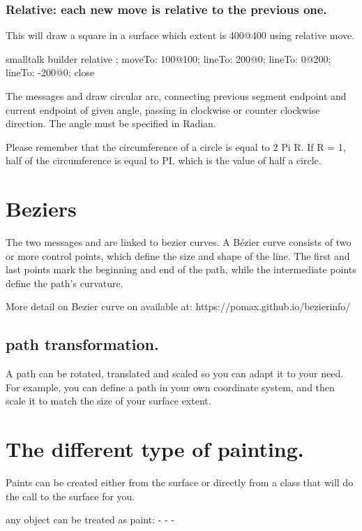 \documentclass[10pt,twoside,english]{_support/latex/sbabook/sbabook}
\begin{document}
\subsubsection{Relative: each new move is relative to the previous one.}
This will draw a square in a surface which extent is 400@400 using relative move.
\begin{displaycode}{smalltalk}
 builder relative ;
  moveTo: 100@100;
  lineTo: 200@0;
  lineTo: 0@200;
  lineTo: -200@0;
  close
\end{displaycode}

The messages  and  draw circular arc, connecting
previous segment endpoint and current endpoint of given angle, passing in
clockwise or counter clockwise direction. The angle must be specified in Radian.

Please remember that the circumference of a circle is equal to 2 Pi  R.
If R = 1, half of the circumference is equal to PI, which is the value of half a circle.

\section{Beziers}
The two messages and  are linked to bezier curves.
A B\'{e}zier curve consists of two or more control points, which define the size and shape of the line. The first and  last points mark the beginning and end of the path, while the intermediate
points define the path's curvature.

More detail on Bezier curve on available at: https://pomax.github.io/bezierinfo/

\subsection{path transformation.}
A path can be rotated, translated and scaled so you can adapt it to your need.
For example, you can define a path in your own coordinate system, and then
scale it to match the size of your surface extent.

\section{The different type of painting.}
Paints can be created either from the surface or directly from a class that will
do the call to the surface for you.

any object can be treated as paint:
- 
- 
- 
\end{document}
